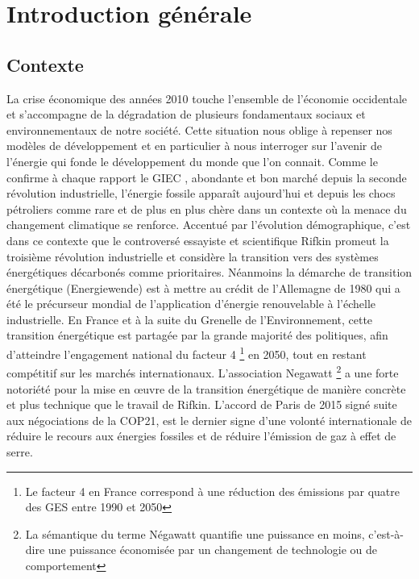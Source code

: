 \chapter*{Introduction générale}

\section*{Contexte}

La crise économique des années 2010 touche l'ensemble de l'économie occidentale et s'accompagne de la dégradation de plusieurs fondamentaux sociaux et environnementaux de notre société. Cette situation nous oblige à repenser nos modèles de développement et en particulier à nous interroger sur l'avenir de l'énergie qui fonde le développement du monde que l'on connait. Comme le confirme à chaque rapport le GIEC \cite{GIEC-14}, abondante et bon marché depuis la seconde révolution industrielle, l'énergie fossile apparaît aujourd'hui et depuis les chocs pétroliers comme rare et de plus en plus chère dans un contexte où la menace du changement climatique se renforce. Accentué par l'évolution démographique, c'est dans ce contexte que le controversé essayiste et scientifique Rifkin \cite{Rifkin-12} promeut la troisième révolution industrielle et considère la transition vers des systèmes énergétiques décarbonés comme prioritaires. Néanmoins la démarche de transition énergétique (Energiewende) est à mettre au crédit de l'Allemagne de 1980 qui a été le précurseur mondial de l'application d'énergie renouvelable à l'échelle industrielle. En France et à la suite du Grenelle de l'Environnement, cette transition énergétique est partagée par la grande majorité des politiques, afin d'atteindre l'engagement national du facteur 4 \footnote{Le facteur 4 en France correspond à une réduction des émissions par quatre des GES entre 1990 et 2050} en 2050, tout en restant compétitif sur les marchés internationaux. L'association Negawatt \footnote{La sémantique du terme Négawatt quantifie une puissance en moins, c'est-à-dire une puissance économisée par un changement de technologie ou de comportement} a une forte notoriété pour la mise en œuvre de la transition énergétique de manière concrète et plus technique que le travail de Rifkin. L'accord de Paris de 2015 signé suite aux négociations de la COP21, est le dernier signe d'une volonté internationale de réduire le recours aux énergies fossiles et de réduire l'émission de gaz à effet de serre.

